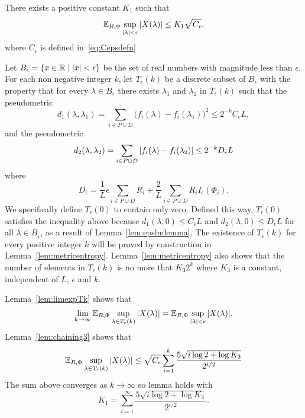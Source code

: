 \documentclass[journal]{IEEEtran}
\begin{document}
\begin{lemma}\label{lem:chaining2}
There exists a positive constant $K_1$ such that
\[
{\mathbb E}_{R,\Phi} \sup_{{\vert \lambda \vert} < \epsilon} {\left\vert  X(\lambda)  \right\vert} \leq K_1 \sqrt{C_\epsilon}.
\]
where $C_\epsilon$ is defined in~\eqref{eq:Cepsdefn}
\end{lemma}
\begin{IEEEproof}
Let $B_\epsilon = \{x \in {\mathbb R} \mid {\left\vert x \right\vert} < \epsilon\}$ be the set of real numbers with magnitude less than $\epsilon$.  For each non negative integer $k$, let $T_\epsilon(k)$ be a discrete subset of $B_\epsilon$ with the property that for every $\lambda \in B_\epsilon$ there exists $\lambda_1$ and $\lambda_2$ in $T_\epsilon(k)$ such that the pseudometric
\[
d_1(\lambda, \lambda_1) = \sum_{i \in P \cup D} \big( f_{i}(\lambda) - f_{i}(\lambda_1) \big)^2 \leq 2^{-k} C_\epsilon L,
\]
and the pseudometric
\[
d_2(\lambda, \lambda_2) = \sum_{i \in P \cup D} {\vert f_{i}(\lambda) - f_{i}(\lambda_2) \vert} \leq 2^{-k} D_\epsilon L
\]
where 
\begin{equation}\label{eq:Depsdefn}
D_\epsilon = \frac{1}{L}\epsilon\sum_{i\in P \cup D}R_i + \frac{2}{L}\sum_{i\in P \cup D}R_i I_{\epsilon}(\Phi_i).
\end{equation}
We specifically define $T_\epsilon(0)$ to contain only zero.  Defined this way, $T_\epsilon(0)$ satisfies the inequality above because $d_1(\lambda, 0) \leq C_\epsilon L $ and $d_2(\lambda, 0) \leq D_\epsilon L$ for all $\lambda \in B_\epsilon$, as a result of Lemma~\ref{lem:epslmlemma}.  
The existence of $T_\epsilon(k)$ for every positive integer $k$ will be proved by construction in Lemma~\ref{lem:metricentropy}.  Lemma~\ref{lem:metricentropy} also shows that the number of elements in $T_\epsilon(k)$ is no more that $K_3 2^k$ where $K_3$ is a constant, independent of $L$, $\epsilon$ and $k$.

Lemma~\ref{lem:limexpTk} shows that
\[
\lim_{k\rightarrow\infty}{\mathbb E}_{R,\Phi}\sup_{\lambda \in T_\epsilon(k)} {\vert X(\lambda) \vert} = {\mathbb E}_{R,\Phi} \sup_{{\vert \lambda \vert} < \epsilon} {\vert X(\lambda) \vert}.
\]
Lemma~\ref{lem:chaining3} shows that
\[
{\mathbb E}_{R,\Phi} \sup_{\lambda \in T_\epsilon(k)} {\vert X(\lambda) \vert} \leq \sqrt{C_\epsilon} \sum_{i=1}^k \frac{5\sqrt{i \log 2 + \log K_3}}{2^{i/2}}
\]
The sum above converges as $k\rightarrow\infty$ so lemma holds with
\[
K_1 = \sum_{i=1}^\infty \frac{5\sqrt{i \log 2 + \log K_3}}{2^{i/2}}.
\]
\end{IEEEproof}
\end{document}

